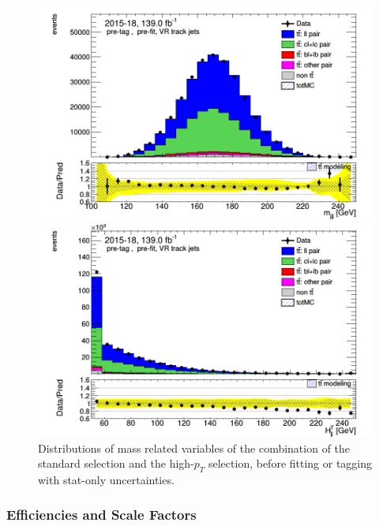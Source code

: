 \documentclass[letterpaper,12pt]{article}
\begin{document}
\begin{figure}
\begin{minipage}[b]{.45\textwidth}
\centering
\includegraphics[width=1\textwidth]{Oct_distributions/pretagNoRwDL1rwithhighpTVRJets_scaledall/DataMC_mjjj.png}
\end{minipage}\hfill
\begin{minipage}[b]{.45\textwidth}
\centering
\includegraphics[width=1\textwidth]{Oct_distributions/pretagNoRwDL1rwithhighpTVRJets_scaledall/DataMC_Htjj.png}
\end{minipage}
\caption{Distributions of mass related variables of the combination of the standard selection and the high-$p_T$ selection, before fitting or tagging with stat-only uncertainties.} \label{fig:mass_VRJets}
\end{figure}

\subsubsection{Efficiencies and Scale Factors}
\end{document}
